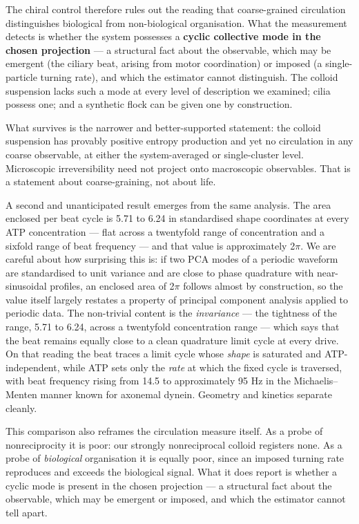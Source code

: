 \documentclass[aps,pre,preprint,superscriptaddress,nofootinbib,longbibliography]{revtex4-2}
\begin{document}
The chiral control therefore rules out the reading that coarse-grained circulation distinguishes biological from non-biological organisation. What the measurement detects is whether the system possesses a \textbf{cyclic collective mode in the chosen projection} --- a structural fact about the observable, which may be emergent (the ciliary beat, arising from motor coordination) or imposed (a single-particle turning rate), and which the estimator cannot distinguish. The colloid suspension lacks such a mode at every level of description we examined; cilia possess one; and a synthetic flock can be given one by construction.

What survives is the narrower and better-supported statement: the colloid suspension has provably positive entropy production and yet no circulation in any coarse observable, at either the system-averaged or single-cluster level. Microscopic irreversibility need not project onto macroscopic observables. That is a statement about coarse-graining, not about life.

A second and unanticipated result emerges from the same analysis. The area enclosed per beat cycle is 5.71 to 6.24 in standardised shape coordinates at every ATP concentration --- flat across a twentyfold range of concentration and a sixfold range of beat frequency --- and that value is approximately 2$\pi$. We are careful about how surprising this is: if two PCA modes of a periodic waveform are standardised to unit variance and are close to phase quadrature with near-sinusoidal profiles, an enclosed area of 2$\pi$ follows almost by construction, so the value itself largely restates a property of principal component analysis applied to periodic data. The non-trivial content is the \emph{invariance} --- the tightness of the range, 5.71 to 6.24, across a twentyfold concentration range --- which says that the beat remains equally close to a clean quadrature limit cycle at every drive. On that reading the beat traces a limit cycle whose \emph{shape} is saturated and ATP-independent, while ATP sets only the \emph{rate} at which the fixed cycle is traversed, with beat frequency rising from 14.5 to approximately 95 Hz in the Michaelis--Menten manner known for axonemal dynein. Geometry and kinetics separate cleanly.

This comparison also reframes the circulation measure itself. As a probe of nonreciprocity it is poor: our strongly nonreciprocal colloid registers none. As a probe of \emph{biological} organisation it is equally poor, since an imposed turning rate reproduces and exceeds the biological signal. What it does report is whether a cyclic mode is present in the chosen projection --- a structural fact about the observable, which may be emergent or imposed, and which the estimator cannot tell apart.
\end{document}
